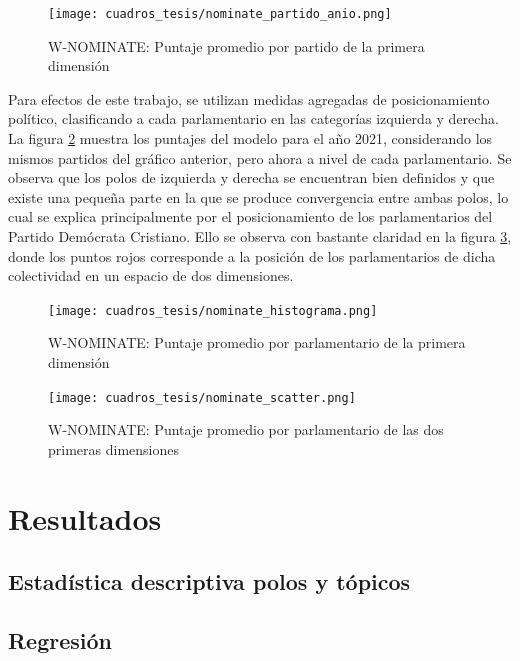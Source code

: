\documentclass[
  12pt,
]{article}
\begin{document}
\begin{figure}[H]
\centering
\large
\caption{W-NOMINATE: Puntaje promedio por partido de la primera dimensión}
\label{w_nominate_plot}
\texttt{[image: cuadros\_tesis/nominate\_partido\_anio.png]}
\normalsize
\end{figure}

Para efectos de este trabajo, se utilizan medidas agregadas de
posicionamiento político, clasificando a cada parlamentario en las
categorías izquierda y derecha. La figura \ref{w_nominate_hist} muestra
los puntajes del modelo para el año 2021, considerando los mismos
partidos del gráfico anterior, pero ahora a nivel de cada parlamentario.
Se observa que los polos de izquierda y derecha se encuentran bien
definidos y que existe una pequeña parte en la que se produce
convergencia entre ambas polos, lo cual se explica principalmente por el
posicionamiento de los parlamentarios del Partido Demócrata Cristiano.
Ello se observa con bastante claridad en la figura
\ref{w_nominate_scatter}, donde los puntos rojos corresponde a la
posición de los parlamentarios de dicha colectividad en un espacio de
dos dimensiones.

\begin{figure}[H]
\centering
\large
\caption{W-NOMINATE: Puntaje promedio por parlamentario de la primera dimensión}
\label{w_nominate_hist}
\texttt{[image: cuadros\_tesis/nominate\_histograma.png]}
\normalsize
\end{figure}

\begin{figure}[H]
\centering
\large
\caption{W-NOMINATE: Puntaje promedio por parlamentario de las dos primeras dimensiones}
\label{w_nominate_scatter}
\texttt{[image: cuadros\_tesis/nominate\_scatter.png]}
\normalsize
\end{figure}

\hypertarget{resultados}{%
\section{Resultados}\label{resultados}}

\hypertarget{estaduxedstica-descriptiva-polos-y-tuxf3picos}{%
\subsection{Estadística descriptiva polos y
tópicos}\label{estaduxedstica-descriptiva-polos-y-tuxf3picos}}

\hypertarget{regresiuxf3n}{%
\subsection{Regresión}\label{regresiuxf3n}}
\end{document}
